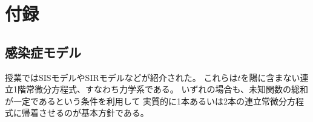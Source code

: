 \documentclass{jlreq}
\begin{document}
\section{付録}

\subsection{感染症モデル}

授業ではSISモデルやSIRモデルなどが紹介された。
これらは$t$を陽に含まない連立1階常微分方程式、すなわち力学系である。
いずれの場合も、未知関数の総和が一定であるという条件を利用して
実質的に1本あるいは2本の連立常微分方程式に帰着させるのが基本方針である。


\ifsubfile
   
   
\fi
\end{document}
